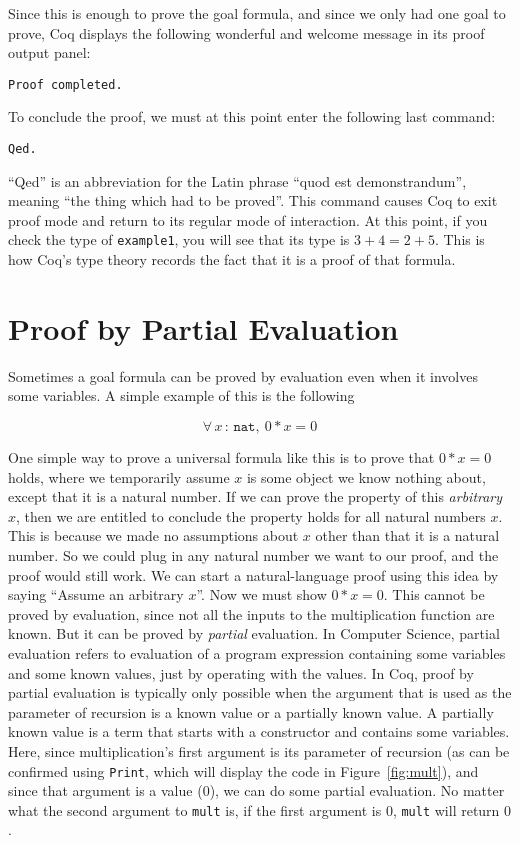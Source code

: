 \documentclass{book}[12pt]
\begin{document}
\noindent Since this is enough to prove the goal formula, and since
we only had one goal to prove, Coq displays the following wonderful
and welcome message in its proof output panel:

\begin{verbatim}
Proof completed.
\end{verbatim}

\noindent To conclude the proof, we must at this point enter the
following last command:

\begin{verbatim}
Qed.
\end{verbatim}

\noindent ``Qed'' is an abbreviation for the Latin phrase ``quod est
demonstrandum'', meaning ``the thing which had to be proved''.  This
command causes Coq to exit proof mode and return to its regular mode
of interaction.  At this point, if you check the type of \texttt{example1},
you will see that its type is $3+4 = 2+5$.  This is how Coq's type theory
records the fact that it is a proof of that formula.

\section{Proof by Partial Evaluation}

Sometimes a goal formula can be proved by evaluation even when it involves
some variables.  A simple example of this is the following 

\[ \forall\, x\,:\,\texttt{nat},\ 0 * x = 0 \]

\noindent One simple way to prove a universal formula like this is to
prove that $0 * x = 0$ holds, where we temporarily assume $x$ is some
object we know nothing about, except that it is a natural number.  If
we can prove the property of this \emph{arbitrary} $x$, then we are
entitled to conclude the property holds for all natural numbers $x$.
This is because we made no assumptions about $x$ other than that it is
a natural number.  So we could plug in any natural number we want to
our proof, and the proof would still work.  We can start a
natural-language proof using this idea by saying ``Assume an arbitrary
$x$''.  Now we must show $0 * x = 0$.  This cannot be proved by
evaluation, since not all the inputs to the multiplication function
are known.  But it can be proved by \emph{partial} evaluation.  In
Computer Science, partial evaluation refers to evaluation of a program
expression containing some variables and some known values, just by
operating with the values.  In Coq, proof by partial evaluation is
typically only possible when the argument that is used as the
parameter of recursion is a known value or a partially known value.  A
partially known value is a term that starts with a constructor and
contains some variables.  Here, since multiplication's first argument
is its parameter of recursion (as can be confirmed using
\texttt{Print}, which will display the code in Figure~\ref{fig:mult}),
and since that argument is a value ($0$), we can do some partial
evaluation.  No matter what the second argument to \texttt{mult} is,
if the first argument is $0$, \texttt{mult} will return $0$.
\end{document}
